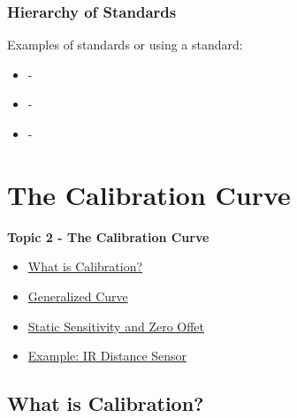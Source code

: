 \documentclass[fleqn]{beamer} %
\newcommand{\sectionIItitle}{The Calibration Curve}
\newcommand{\sectionIsubsectionIVtitle}{Hierarchy of Standards}
\newcommand{\sectionIIsubsectionItitle}{What is Calibration?}
\newcommand{\sectionIIsubsectionIItitle}{Generalized Curve}
\newcommand{\sectionIIsubsectionIIItitle}{Static Sensitivity and Zero Offet}
\newcommand{\sectionIIsubsectionIVtitle}{Example: IR Distance Sensor}
\begin{document}
			\begin{frame}
				\frametitle{\sectionIsubsectionIVtitle}

\bigskip
Examples of standards or using a standard:
\begin{itemize}
  \item -
  \item -
  \item -
\end{itemize}



			\end{frame}

	
	\section{\sectionIItitle}\label{sectionII}

		\begin{frame}
			\large \textbf{Topic 2 - \sectionIItitle} \vspace{3mm}\\

			\begin{itemize}
				\item \hyperlink{sectionIIsubsectionI}{\sectionIIsubsectionItitle} \vspc %
				\item \hyperlink{sectionIIsubsectionII}{\sectionIIsubsectionIItitle} \vspc %
				\item \hyperlink{sectionIIsubsectionIII}{\sectionIIsubsectionIIItitle} \vspc %
				\item \hyperlink{sectionIIsubsectionIV}{\sectionIIsubsectionIVtitle} \vspc %
			\end{itemize}

		\end{frame}

		\subsection{\sectionIIsubsectionItitle}\label{sectionIIsubsectionI}
\end{document}
